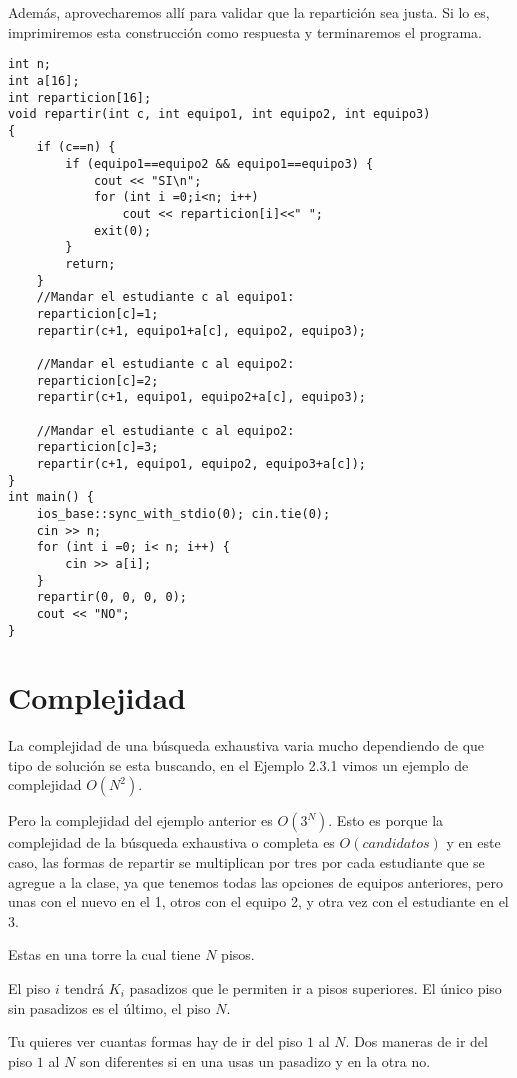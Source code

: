 Además, aprovecharemos allí para validar que la repartición sea justa. Si lo es, imprimiremos esta construcción como respuesta y terminaremos el programa.
\pagebreak
\begin{lstlisting}
int n;
int a[16];
int reparticion[16];
void repartir(int c, int equipo1, int equipo2, int equipo3) 
{
	if (c==n) {
		if (equipo1==equipo2 && equipo1==equipo3) {
			cout << "SI\n";
			for (int i =0;i<n; i++) 
				cout << reparticion[i]<<" ";					
			exit(0);
		}
		return;
	}
	//Mandar el estudiante c al equipo1:
	reparticion[c]=1;
	repartir(c+1, equipo1+a[c], equipo2, equipo3);
	
	//Mandar el estudiante c al equipo2:
	reparticion[c]=2;
	repartir(c+1, equipo1, equipo2+a[c], equipo3);
	
	//Mandar el estudiante c al equipo2:
	reparticion[c]=3;
	repartir(c+1, equipo1, equipo2, equipo3+a[c]);
}
int main() {
	ios_base::sync_with_stdio(0); cin.tie(0);
	cin >> n;
	for (int i =0; i< n; i++) {
		cin >> a[i];
	}
	repartir(0, 0, 0, 0);
	cout << "NO";
}

\end{lstlisting}

\section*{Complejidad}
La complejidad de una búsqueda exhaustiva varia mucho dependiendo de que tipo de solución se esta buscando, en el Ejemplo 2.3.1 vimos un ejemplo de complejidad \(O(N^2)\). 

Pero la complejidad del ejemplo anterior es \(O(3^N)\). Esto es porque la complejidad de la búsqueda exhaustiva o completa es \(O(candidatos)\) y en este caso, las formas de repartir se multiplican por tres por cada estudiante que se agregue a la clase, ya que tenemos todas las opciones de equipos anteriores, pero unas con el nuevo en el 1, otros con el equipo 2, y otra vez con el estudiante en el 3.




\problemtitle Estas en una torre la cual tiene \(N\) pisos.

El piso \(i\) tendrá \(K_i\) pasadizos que le permiten ir a pisos superiores. El único piso sin pasadizos es el último, el piso \(N\).

Tu quieres ver cuantas formas hay de ir del piso \(1\) al \(N\). Dos maneras de ir del piso \(1\) al \(N\) son diferentes si en una usas un pasadizo y en la otra no.

